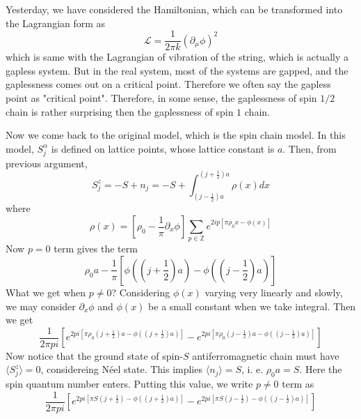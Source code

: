 Yesterday, we have considered the Hamiltonian, which can be transformed into the Lagrangian form as
\begin{equation}
\mathcal{L}=\frac{1}{2\pi k}(\partial_\mu \phi)^2
\end{equation}
which is same with the Lagrangian of vibration of the string, which is actually a gapless system. But in the real system, most of the systems are gapped, and the gaplessness comes out on a critical point. Therefore we often say the gapless point as "critical point". Therefore, in some sense, the gaplessness of spin $1/2$ chain is rather surprising then the gaplessness of spin $1$ chain.

Now we come back to the original model, which is the spin chain model. In this model, $S_j^\alpha$ is defined on lattice points, whose lattice constant is $a$. Then, from previous argument,
\begin{equation}
S_j^z=-S+n_j=-S+\int_{(j-\frac{1}{2})a}^{(j+\frac{1}{2})a}\rho(x)dx
\end{equation}
where
\begin{equation}
\rho(x)=\left[\rho_0-\frac{1}{\pi}\partial_x\phi\right]\sum_{p\in \mathbb{Z}}e^{2ip[\pi\rho_0 x-\phi(x)]}
\end{equation}
Now $p=0$ term gives the term
\begin{equation}
\rho_0 a-\frac{1}{\pi}[\phi((j+\frac{1}{2})a)-\phi((j-\frac{1}{2})a)]
\end{equation}
What we get when $p\neq 0$? Considering $\phi(x)$ varying very linearly and slowly, we may consider $\partial_x\phi$ and $\phi(x)$ be a small constant when we take integral. Then we get
\begin{equation}
\frac{1}{2\pi p i}\left[e^{2p i\left[\pi \rho_0 \left(j+\frac{1}{2}\right)a-\phi\left(\left(j+\frac{1}{2}\right)a\right)\right]}-e^{2p i\left[\pi \rho_0 \left(j-\frac{1}{2}\right)a-\phi\left(\left(j-\frac{1}{2}\right)a\right)\right]}\right]
\end{equation}
Now notice that the ground state of spin-$S$ antiferromagnetic chain must have $\langle S_j^z\rangle=0$, considereing N{\'e}el state. This implies $\langle n_j\rangle=S$, i. e. $\rho_0 a=S$. Here the spin quantum number enters. Putting this value, we write $p\neq 0$ term as
\begin{equation}
\frac{1}{2\pi p i}\left[e^{2p i\left[\pi S \left(j+\frac{1}{2}\right)-\phi\left(\left(j+\frac{1}{2}\right)a\right)\right]}-e^{2p i\left[\pi S \left(j-\frac{1}{2}\right)-\phi\left(\left(j-\frac{1}{2}\right)a\right)\right]}\right]
\end{equation}


